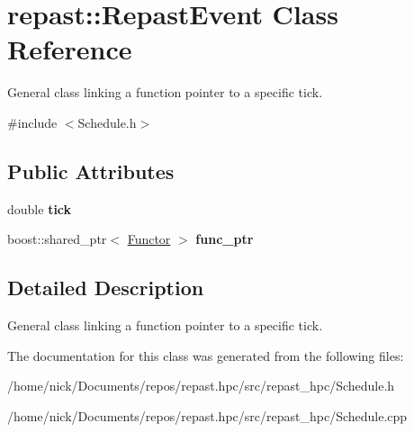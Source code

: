 \hypertarget{classrepast_1_1_repast_event}{\section{repast\-:\-:Repast\-Event Class Reference}
\label{classrepast_1_1_repast_event}
}


General class linking a function pointer to a specific tick.  




{\ttfamily \#include $<$Schedule.\-h$>$}

\subsection*{Public Attributes}
\begin{DoxyCompactItemize}
\item 
\hypertarget{classrepast_1_1_repast_event_ac5266fa3c8de0f952b07652149028068}{double {\bfseries tick}}\label{classrepast_1_1_repast_event_ac5266fa3c8de0f952b07652149028068}

\item 
\hypertarget{classrepast_1_1_repast_event_add470a280d1a34ec9bced03f93df2c65}{boost\-::shared\-\_\-ptr$<$ \hyperlink{classrepast_1_1_functor}{Functor} $>$ {\bfseries func\-\_\-ptr}}\label{classrepast_1_1_repast_event_add470a280d1a34ec9bced03f93df2c65}

\end{DoxyCompactItemize}


\subsection{Detailed Description}
General class linking a function pointer to a specific tick. 

The documentation for this class was generated from the following files\-:\begin{DoxyCompactItemize}
\item 
/home/nick/\-Documents/repos/repast.\-hpc/src/repast\-\_\-hpc/Schedule.\-h\item 
/home/nick/\-Documents/repos/repast.\-hpc/src/repast\-\_\-hpc/Schedule.\-cpp\end{DoxyCompactItemize}
